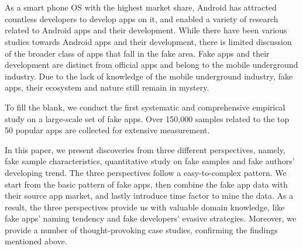 \newpage


\chapter*{}
\vspace{-5mm}

As a smart phone OS with the highest market share, Android has attracted countless developers to develop apps on it, and enabled a variety of research related to Android apps and their development.
While there have been various studies towards Android apps and their development, there is limited discussion of the broader class of apps that fall in the fake area.
Fake apps and their development are distinct from official apps and belong to the mobile underground industry.
Due to the lack of knowledge of the mobile underground industry, fake apps, their ecosystem and nature still remain in mystery.

To fill the blank, we conduct the first systematic and comprehensive empirical study on a large-scale set of fake apps.
Over 150,000 samples related to the top 50 popular apps are collected for extensive measurement.

In this paper, we present discoveries from three different perspectives, namely, fake sample characteristics, quantitative study on fake samples and fake authors’ developing trend.
The three perspectives follow a easy-to-complex pattern.
We start from the basic pattern of fake apps, then combine the fake app data with their source app market, and lastly introduce time factor to mine the data.
As a result, the three perspectives provide us with valuable domain knowledge, like fake apps’ naming tendency and fake developers’ evasive strategies.
Moreover, we provide a number of thought-provoking case studies, confirming the findings mentioned above.

